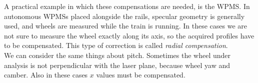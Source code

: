 A practical example in which these compensations are needed, is the \acs{WPMS}. In autonomous \acs{WPMS}s placed alongside the rails, specular geometry is generally used, and wheels are measured while the train is running. In these cases we are not sure to measure the wheel exactly along its axis, so the acquired profiles have to be compensated. This type of correction is called \textit{radial compensation}. \\
We can consider the same things about pitch. Sometimes the wheel under analysis is not perpendicular with the laser plane, because wheel yaw and camber. Also in these cases $x$ values must be compensated.

